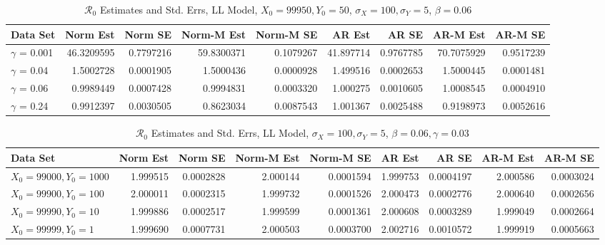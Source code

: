 \documentclass[12pt]{article}
\newcommand{\rr}{\ensuremath{\mathcal{R}_0}}
\begin{document}
\begin{table}[H]
	
	\caption{\label{tab:}$\rr$ Estimates and Std. Errs, LL Model,
		$X_0 = 99950, Y_0 = 50$, $\sigma_X = 100, \sigma_Y = 5$, $\beta = 0.06$}
	\centering
	\begin{footnotesize}
		\begin{tabular}[t]{l|r|r|r|r|r|r|r|r}
			\hline
			Data Set & Norm Est & Norm SE & Norm-M Est & Norm-M SE & AR Est & AR SE & AR-M Est & AR-M SE\\
			\hline
			$\gamma$ = 0.001 & 46.3209595 & 0.7797216 & 59.8300371 & 0.1079267 & 41.897714 & 0.9767785 & 70.7075929 & 0.9517239\\
			\hline
			$\gamma$ = 0.04 & 1.5002728 & 0.0001905 & 1.5000436 & 0.0000928 & 1.499516 & 0.0002653 & 1.5000445 & 0.0001481\\
			\hline
			$\gamma$ = 0.06 & 0.9989449 & 0.0007428 & 0.9994831 & 0.0003320 & 1.000275 & 0.0010605 & 1.0008545 & 0.0004910\\
			\hline
			$\gamma$ = 0.24 & 0.9912397 & 0.0030505 & 0.8623034 & 0.0087543 & 1.001367 & 0.0025488 & 0.9198973 & 0.0052616\\
			\hline
		\end{tabular}
	\end{footnotesize}
\end{table}

\begin{table}[H]
	
	\caption{\label{tab:}$\rr$ Estimates and Std. Errs, LL Model,
		$\sigma_X = 100, \sigma_Y = 5$, $\beta = 0.06, \gamma = 0.03$}
	\centering
	\begin{footnotesize}
		\begin{tabular}[t]{l|r|r|r|r|r|r|r|r}
			\hline
			Data Set & Norm Est & Norm SE & Norm-M Est & Norm-M SE & AR Est & AR SE & AR-M Est & AR-M SE\\
			\hline
			$X_0 = 99000, Y_0 = 1000$ & 1.999515 & 0.0002828 & 2.000144 & 0.0001594 & 1.999753 & 0.0004197 & 2.000586 & 0.0003024\\
			\hline
			$X_0 = 99900, Y_0 = 100$ & 2.000011 & 0.0002315 & 1.999732 & 0.0001526 & 2.000473 & 0.0002776 & 2.000640 & 0.0002656\\
			\hline
			$X_0 = 99990, Y_0 = 10$ & 1.999886 & 0.0002517 & 1.999599 & 0.0001361 & 2.000608 & 0.0003289 & 1.999049 & 0.0002664\\
			\hline
			$X_0 = 99999, Y_0 = 1$ & 1.999690 & 0.0007731 & 2.000503 & 0.0003700 & 2.002716 & 0.0010572 & 1.999919 & 0.0005663\\
			\hline
		\end{tabular}
	\end{footnotesize}
\end{table}
\end{document}
